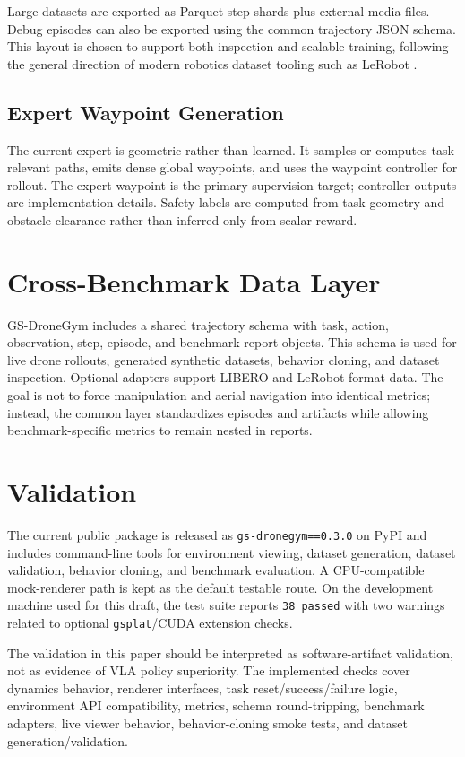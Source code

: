 \documentclass[11pt]{article}
\begin{document}
Large datasets are exported as Parquet step shards plus external media files. Debug episodes can also be exported using the common trajectory JSON schema. This layout is chosen to support both inspection and scalable training, following the general direction of modern robotics dataset tooling such as LeRobot \cite{cadene2024lerobot}.

\subsection{Expert Waypoint Generation}

The current expert is geometric rather than learned. It samples or computes task-relevant paths, emits dense global waypoints, and uses the waypoint controller for rollout. The expert waypoint is the primary supervision target; controller outputs are implementation details. Safety labels are computed from task geometry and obstacle clearance rather than inferred only from scalar reward.

\section{Cross-Benchmark Data Layer}

GS-DroneGym includes a shared trajectory schema with task, action, observation, step, episode, and benchmark-report objects. This schema is used for live drone rollouts, generated synthetic datasets, behavior cloning, and dataset inspection. Optional adapters support LIBERO and LeRobot-format data. The goal is not to force manipulation and aerial navigation into identical metrics; instead, the common layer standardizes episodes and artifacts while allowing benchmark-specific metrics to remain nested in reports.

\section{Validation}

The current public package is released as \texttt{gs-dronegym==0.3.0} on PyPI and includes command-line tools for environment viewing, dataset generation, dataset validation, behavior cloning, and benchmark evaluation. A CPU-compatible mock-renderer path is kept as the default testable route. On the development machine used for this draft, the test suite reports \texttt{38 passed} with two warnings related to optional \texttt{gsplat}/CUDA extension checks.

The validation in this paper should be interpreted as software-artifact validation, not as evidence of VLA policy superiority. The implemented checks cover dynamics behavior, renderer interfaces, task reset/success/failure logic, environment API compatibility, metrics, schema round-tripping, benchmark adapters, live viewer behavior, behavior-cloning smoke tests, and dataset generation/validation.
\end{document}
